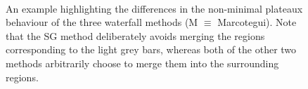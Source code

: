 \documentclass[preprint,a4paper]{elsarticle}
\newenvironment{stusubfig}[1]
{
	\begin{figure}[#1]
	\begin{center}
}
{
	\end{center}
	\end{figure}
}
\begin{document}
\begin{stusubfig}{!t}
	\hspace{4mm}%
	\\
	\hspace{4mm}%
\caption{An example highlighting the differences in the non-minimal plateaux behaviour of the three waterfall methods (M $\equiv$ Marcotegui). Note that the SG method deliberately avoids merging the regions corresponding to the light grey bars, whereas both of the other two methods arbitrarily choose to merge them into the surrounding regions.}
\label{fig:plateaux-behaviour}
\end{stusubfig}
\end{document}
